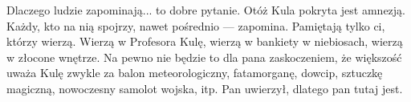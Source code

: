 Dlaczego ludzie zapominają... to dobre pytanie.
Otóż Kula pokryta jest amnezją. Każdy, kto na nią spojrzy, nawet pośrednio --- zapomina.
Pamiętają tylko ci, którzy wierzą. Wierzą w Profesora Kulę, wierzą w bankiety w niebiosach, wierzą w złocone wnętrze.
Na pewno nie będzie to dla pana zaskoczeniem, że większość uważa Kulę zwykle za balon meteorologiczny, fatamorganę, dowcip, sztuczkę magiczną, nowoczesny samolot wojska, itp.
Pan uwierzył, dlatego pan tutaj jest.






